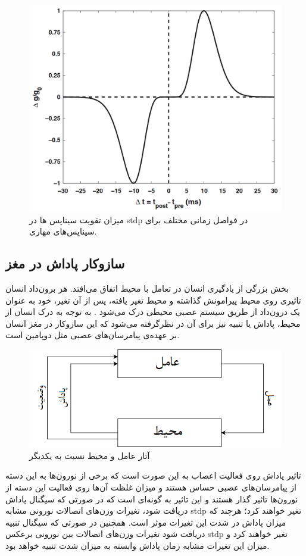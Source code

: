 \documentclass[12pt]{report}
\begin{document}
	\begin{figure}[H]
		\centering
		\includegraphics[width=0.7\linewidth]{stdp-inh.png}
		\caption[NS]{
			میزان تقویت سیناپس ها در \gls{stdp} در فواصل زمانی مختلف برای سیناپس‌های مهاری.
		}
		\label{fig:stdp-inh}
	\end{figure}
	
	\subsection{سازوکار پاداش در مغز}
	\label{section:reward-in-brain}
	
	بخش بزرگی از یادگیری انسان در تعامل با محیط اتفاق می‌افتد. هر برون‌داد انسان تاثیری روی محیط پیرامونش گذاشته و محیط تغیر یافته، پس از آن تغیر، خود به عنوان یک درون‌داد از طریق سیستم عصبی محیطی درک می‌شود
	\cite{sutton1998reinforcement}.
	به توجه به درک انسان از محیط، پاداش یا تنبیه نیز برای آن در نظرگرفته می‌شود که این ساز‌و‌کار در مغز انسان بر عهده‌ی پیامرسان‌های عصبی  مثل دوپامین است. 
	
	\begin{figure}[H]
		\centering
		\includegraphics[width=0.7\linewidth]{rl.png}
		\caption[NS]{
			آثار عامل و محیط نسبت به یکدیگر
		}
		\label{fig:rl}
	\end{figure}
	
	تاثیر پاداش روی فعالیت اعصاب به این صورت است که برخی از نورون‌ها به این دسته از پیامرسان‌‌های عصبی حساس هستند و میزان غلظت آن‌ها روی فعالیت این دسته از نورون‌ها تاثیر گذار هستند و این تاثیر به گونه‌ای است که در صورتی که سیگنال پاداش دریافت شود، تغیرات وزن‌های اتصالات نورونی مشابه \gls{stdp} تغیر خواهند کرد؛ هرچند که میزان پاداش در شدت این تغیرات موثر است. همچنین در صورتی که سیگنال تنبیه دریافت شود تغیرات وزن‌های اتصالات بین نورونی برعکس \gls{stdp} تغیر خواهند کرد و میزان این تغیرات مشابه زمان پاداش وابسته به میزان شدت تنبیه خواهد بود.
	
\end{document}
